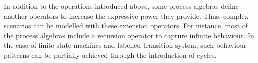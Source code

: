 In addition to the operations introduced above, some
process algebras define another operators to increase the expressive power they provide.
Thus, complex scenarios can be modelled with these extension operators. For instance, most of the process algebras 
include a recursion operator to capture infinite behaviour. 
In the case of finite state machines and
labelled transition system, such behaviour patterns
can be partially achieved through the introduction of cycles. 



